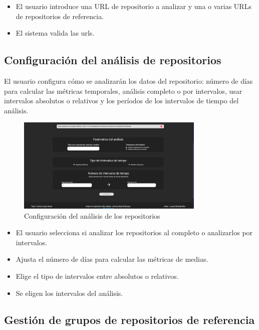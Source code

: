 \begin{itemize}
    \item El usuario introduce una URL de repositorio a analizar y una o varias URLs de repositorios de referencia.
    \item El sistema valida las urls.
\end{itemize}

\newpage
\subsection{Configuración del análisis de repositorios}

El usuario configura cómo se analizarán los datos del repositorio: número de días para calcular las métricas temporales, análisis completo o por intervalos, usar intervalos absolutos o relativos y los períodos de los intervalos de tiempo del análisis.

\begin{figure}[H]
\centering
\includegraphics[width=0.8\textwidth]{img/E4.1-configuracion-analisis.png}
\caption{Configuración del análisis de los repositorios}
\label{fig:E4.1-configuracion-analisis}
\end{figure}

\begin{itemize}
    \item El usuario selecciona si analizar los repositorios al completo o analizarlos por intervalos.
    \item Ajusta el número de días para calcular las métricas de medias.
    \item Elige el tipo de intervalos entre absolutos o relativos.
    \item Se eligen los intervalos del análisis.
\end{itemize}

\newpage
\subsection{Gestión de grupos de repositorios de referencia}

